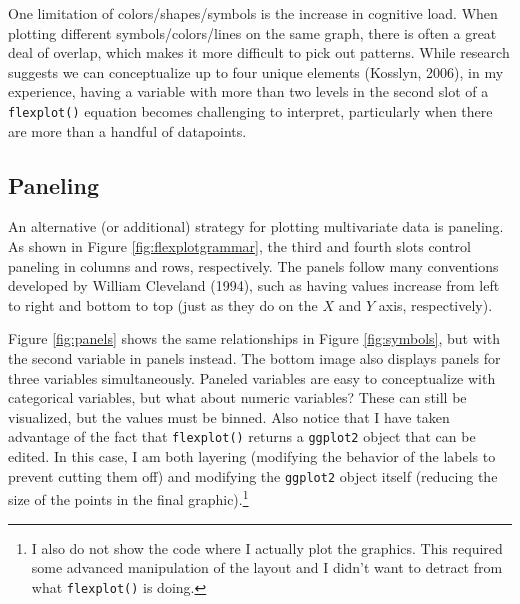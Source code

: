 \documentclass[
  man]{apa6}
\begin{document}
One limitation of colors/shapes/symbols is the increase in cognitive load. When plotting different symbols/colors/lines on the same graph, there is often a great deal of overlap, which makes it more difficult to pick out patterns. While research suggests we can conceptualize up to four unique elements (Kosslyn, 2006), in my experience, having a variable with more than two levels in the second slot of a \texttt{flexplot()} equation becomes challenging to interpret, particularly when there are more than a handful of datapoints.

\hypertarget{paneling}{%
\subsection{Paneling}\label{paneling}}

An alternative (or additional) strategy for plotting multivariate data is paneling. As shown in Figure \ref{fig:flexplotgrammar}, the third and fourth slots control paneling in columns and rows, respectively. The panels follow many conventions developed by William Cleveland (1994), such as having values increase from left to right and bottom to top (just as they do on the \(X\) and \(Y\) axis, respectively).

Figure \ref{fig:panels} shows the same relationships in Figure \ref{fig:symbols}, but with the second variable in panels instead. The bottom image also displays panels for three variables simultaneously. Paneled variables are easy to conceptualize with categorical variables, but what about numeric variables? These can still be visualized, but the values must be binned. Also notice that I have taken advantage of the fact that \texttt{flexplot()} returns a \texttt{ggplot2} object that can be edited. In this case, I am both layering (modifying the behavior of the labels to prevent cutting them off) and modifying the \texttt{ggplot2} object itself (reducing the size of the points in the final graphic).\footnote{I also do not show the code where I actually plot the graphics. This required some advanced manipulation of the layout and I didn't want to detract from what \texttt{flexplot()} is doing.}
\end{document}
